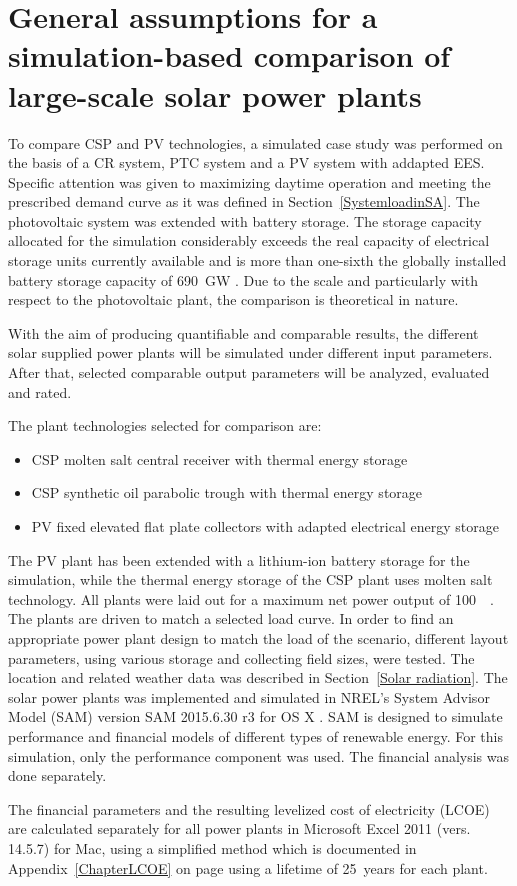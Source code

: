 \chapter{General assumptions for a simulation-based comparison of large-scale solar power plants}
To compare CSP and PV technologies, a simulated case study was performed on the basis of a CR system, PTC system and a PV system with addapted EES. Specific attention was given to maximizing daytime operation and meeting the prescribed demand curve as it was defined in Section~\ref{SystemloadinSA}. The photovoltaic system was extended with battery storage. The storage capacity allocated for the simulation considerably exceeds the real capacity of electrical storage units currently available and is more than one-sixth the globally installed battery storage capacity of \SI{690}{GW} \cite{IEA2015}. Due to the scale and particularly with respect to the photovoltaic plant, the comparison is theoretical in nature.

With the aim of producing quantifiable and comparable results, the different solar supplied power plants will be simulated under different input  parameters. After that, selected comparable output parameters will be analyzed, evaluated and rated.

The plant technologies selected for comparison are: 
\begin{itemize}
\item CSP molten salt central receiver with thermal energy storage
\item CSP synthetic oil parabolic trough with thermal energy storage
\item PV fixed elevated flat plate collectors with adapted electrical energy storage
\end{itemize}
The PV plant has been extended with a lithium-ion battery storage for the simulation, while the thermal energy storage of the CSP plant uses molten salt technology. All plants were laid out for a maximum net power output of \SI{100}{\mega\wattel}. The plants are driven to match a selected load curve. In order to find an appropriate power plant design to match the load of the scenario, different layout parameters, using various storage and collecting field sizes, were tested. The location and related weather data was described in Section~\ref{Solar radiation}. The solar power plants was implemented and simulated in NREL’s System Advisor Model (SAM) version SAM 2015.6.30 r3 for OS X \cite{NREL2015}. SAM is designed to simulate performance and financial models of different types of renewable energy. For this simulation, only the performance component was used. The financial analysis was done separately. 

The financial parameters and the resulting levelized cost of electricity (LCOE) are calculated separately for all power plants in Microsoft Excel 2011 (vers. 14.5.7) for Mac, using a simplified method which is documented in Appendix~\ref{ChapterLCOE} on page \pageref{ChapterLCOE} using a lifetime of \SI{25}{years} for each plant.

\pagebreak 